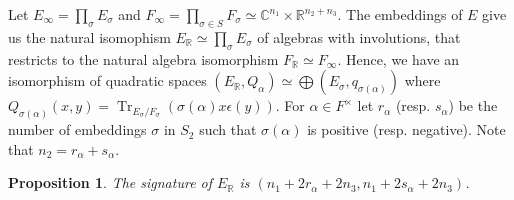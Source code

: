 \documentclass[11pt]{article} %
\newcommand{\8}{\infty}
\newcommand{\R}{\mathbb{R}}
\newcommand{\C}{\mathbb{C}}
\newcommand{\Tr}{\operatorname{Tr}}
\theoremstyle{mytheoremstyle}
\newtheorem{prop}[thm]{Proposition}
\theoremstyle{remark}
\numberwithin{equation}{section}
\begin{document}
Let $E_\8 = \prod_\sigma E_\sigma$ and $F_\8 = \prod_{\sigma \in S} F_\sigma \simeq \C^{n_1} \times \R^{n_2+n_3}$. The embeddings of $E$ give us the natural isomophism $E_\R \simeq \prod_\sigma E_\sigma$ of algebras with involutions, that restricts to the natural algebra isomorphism $F_{\R} \simeq F_\8$. Hence, we have an isomorphism of quadratic spaces $(E_\R, Q_\alpha) \simeq \bigoplus (E_\sigma,q_{\sigma(\alpha)})$ where $Q_{\sigma(\alpha)}(x,y)=\Tr_{E_\sigma/F_\sigma}(\sigma(\alpha)x\epsilon(y))$.
For $\alpha \in F^\times$ let $r_\alpha$ (resp. $s_\alpha$) be the number of embeddings $\sigma$ in $S_2$ such that $\sigma(\alpha)$ is positive (resp. negative). Note that $n_2=r_\alpha+s_\alpha$.
\begin{prop} \label{sign1} The signature of $E_\R$ is $(n_1+2r_\alpha+2n_3,n_1+2s_\alpha+2n_3)$. 
\end{prop}
\end{document}
